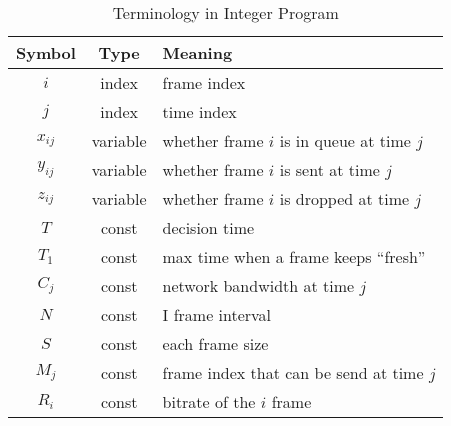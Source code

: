 \begin{table}[tb]
\centering
\caption{Terminology in Integer Program}
\label{tbl:term}
{\setlength{\tabcolsep}{1pt}
\begin{tabular}{|c|c|l|}
\hline
\textbf{Symbol} & \textbf{Type} & \textbf{Meaning}                      \\ \hline
$i$               & index         & frame index                           \\ \hline
$j$               & index         & time index                            \\ \hline
$x_{ij}$             & variable      & whether frame $i$ is in queue at time $j$ \\ \hline
$y_{ij}$             & variable      & whether frame $i$ is sent at time $j$     \\ \hline
$z_{ij}$             & variable      & whether frame $i$ is dropped at time $j$  \\ \hline
$T$               & const         & decision time                        \\ \hline
$T_1$             & const       & max time when a frame keeps ``fresh'' \\ \hline
$C_j$              & const         & network bandwidth at time $j$           \\ \hline
$N$               & const         & I frame interval                      \\ \hline
$S$            & const         & each frame size                        \\ \hline
$M_{j}$       & const         & frame index that can be send at time $j$ \\ \hline
$R_{i}$        & const         & bitrate of the $i$ frame               \\ \hline
\end{tabular}}
\end{table}
